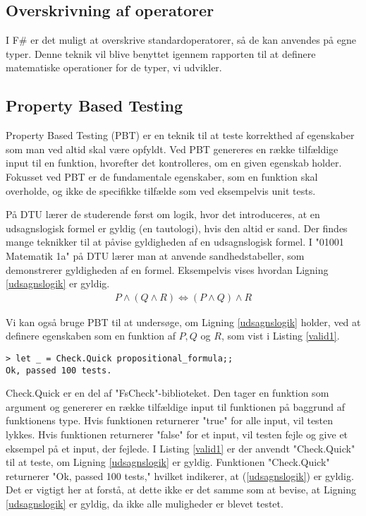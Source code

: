 \subsection{Overskrivning af operatorer}
I F\# er det muligt at overskrive standardoperatorer, så de kan anvendes på egne typer. Denne teknik vil blive benyttet igennem rapporten til at definere matematiske operationer for de typer, vi udvikler.

\subsection{Property Based Testing}
Property Based Testing (PBT) er en teknik til at teste korrekthed af egenskaber som man ved altid skal være opfyldt. Ved PBT genereres en række tilfældige input til en funktion, hvorefter det kontrolleres, om en given egenskab holder. Fokusset ved PBT er de fundamentale egenskaber, som en funktion skal overholde, og ikke de specifikke tilfælde som ved eksempelvis unit tests.

På DTU lærer de studerende først om logik, hvor det introduceres, at en udsagnslogisk formel er gyldig (en tautologi), hvis den altid er sand. Der findes mange teknikker til at påvise gyldigheden af en udsagnslogisk formel. I "01001 Matematik 1a" på DTU lærer man at anvende sandhedstabeller, som demonstrerer gyldigheden af en formel. Eksempelvis vises hvordan Ligning \eqref{udsagnslogik} er gyldig.
\begin{gather}
    P \land (Q \land R) \iff (P \land Q) \land R
    \label{udsagnslogik}
\end{gather}

Vi kan også bruge PBT til at undersøge, om Ligning \eqref{udsagnslogik} holder, ved at definere egenskaben som en funktion af $P, Q$ og $R$, som vist i Listing \ref{valid1}.



\begin{lstlisting}[style=output, label={lst:output_example}, caption={Output ved PBT af (\ref{udsagnslogik})}]
> let _ = Check.Quick propositional_formula;;
Ok, passed 100 tests.
\end{lstlisting}

Check.Quick er en del af "FsCheck"-biblioteket. Den tager en funktion som argument og genererer en række tilfældige input til funktionen på baggrund af funktionens type. Hvis funktionen returnerer "true" for alle input, vil testen lykkes. Hvis funktionen returnerer "false" for et input, vil testen fejle og give et eksempel på et input, der fejlede. I Listing \ref{valid1} er der anvendt "Check.Quick" til at teste, om Ligning \eqref{udsagnslogik} er gyldig. Funktionen "Check.Quick" returnerer "Ok, passed 100 tests," hvilket indikerer, at (\ref{udsagnslogik}) er gyldig. Det er vigtigt her at forstå, at dette ikke er det samme som at bevise, at Ligning \eqref{udsagnslogik} er gyldig, da ikke alle muligheder er blevet testet.

